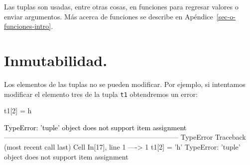 \documentclass[
  spanish,
  letterpaper,
]{scrbook}
\newenvironment{Shaded}{\begin{snugshade}}{\end{snugshade}}
\newcommand{\DecValTok}[1]{\textcolor[rgb]{0.68,0.00,0.00}{#1}}
\newcommand{\NormalTok}[1]{\textcolor[rgb]{0.00,0.23,0.31}{#1}}
\newcommand{\OperatorTok}[1]{\textcolor[rgb]{0.37,0.37,0.37}{#1}}
\newcommand{\StringTok}[1]{\textcolor[rgb]{0.13,0.47,0.30}{#1}}
\theoremstyle{definition}
\theoremstyle{remark}
\begin{document}
Las tuplas son usadas, entre otras cosas, en funciones para regresar
valores o enviar argumentos. Más acerca de funciones se describe en
Apéndice~\ref{sec-o-funciones-intro}.

\section{Inmutabilidad.}\label{inmutabilidad.}

Los elementos de las tuplas no se pueden modificar. Por ejemplo, si
intentamos modificar el elemento tres de la tupla \texttt{t1}
obtendremos un error:

\begin{Shaded}
\begin{Highlighting}[]
\NormalTok{t1[}\DecValTok{2}\NormalTok{] }\OperatorTok{=} \StringTok{\textquotesingle{}h\textquotesingle{}}
\end{Highlighting}
\end{Shaded}

\begin{Highlighting}
\textcolor{black}{TypeError: 'tuple' object does not support item assignment}
\textcolor{black}{}\textcolor{QuartoInternalColor1}{---------------------------------------------------------------------------}\textcolor{QuartoInternalColor2}{}
\textcolor{QuartoInternalColor2}{}\textcolor{QuartoInternalColor1}{TypeError}\textcolor{QuartoInternalColor2}{                                 Traceback (most recent call last)}
\textcolor{QuartoInternalColor2}{}\textcolor{QuartoInternalColor3}{Cell}\textcolor{QuartoInternalColor2}{}\textcolor{QuartoInternalColor3}{ }\textcolor{QuartoInternalColor2}{}\textcolor{QuartoInternalColor4}{In[17]}\textcolor{QuartoInternalColor2}{}\textcolor{QuartoInternalColor4}{, line 1}\textcolor{QuartoInternalColor2}{}
\textcolor{QuartoInternalColor2}{}\textcolor{QuartoInternalColor4}{----> }\textcolor{QuartoInternalColor2}{}\textcolor{QuartoInternalColor4}{1}\textcolor{QuartoInternalColor2}{ }\textcolor{QuartoInternalColor2}{t1}\textcolor{QuartoInternalColor2}{}\textcolor{QuartoInternalColor2}{[}\textcolor{QuartoInternalColor2}{}\textcolor{QuartoInternalColor2}{2}\textcolor{QuartoInternalColor2}{}\textcolor{QuartoInternalColor2}{]}\textcolor{QuartoInternalColor2}{ = }\textcolor{QuartoInternalColor6}{'}\textcolor{QuartoInternalColor2}{}\textcolor{QuartoInternalColor6}{h}\textcolor{QuartoInternalColor2}{}\textcolor{QuartoInternalColor6}{'}\textcolor{QuartoInternalColor2}{}
\textcolor{QuartoInternalColor2}{}\textcolor{QuartoInternalColor1}{TypeError}\textcolor{QuartoInternalColor2}{: 'tuple' object does not support item assignment}
\end{Highlighting}
\end{document}
